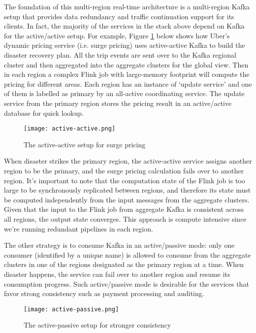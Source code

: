 \documentclass[sigconf]{acmart}
\begin{document}
The foundation of this multi-region real-time architecture is a multi-region Kafka setup that provides data redundancy and traffic continuation support for its clients. In fact, the majority of the services in the stack above depend on Kafka for the active/active setup. For example, Figure \ref{fig:active-active} below shows how Uber’s dynamic pricing service (i.e. surge pricing) uses active-active Kafka to build the disaster recovery plan. All the trip events are sent over to the Kafka regional cluster and then aggregated into the aggregate clusters for the global view. Then in each region a complex Flink job with large-memory footprint will compute the pricing for different areas. Each region has an instance of ‘update service’ and one of them is labelled as primary by an all-active coordinating service. The update service from the primary region stores the pricing result in an active/active database for quick lookup.

\begin{figure}[h]
  \centering
  \texttt{[image: active-active.png]}
  \caption{The active-active setup for surge pricing}
  \label{fig:active-active}
\end{figure}

When disaster strikes the primary region, the active-active service assigns another region to be the primary, and the surge pricing calculation fails over to another region. It’s important to note that the computation state of the Flink job is too large to be synchronously replicated between regions, and therefore its state must be computed independently from the input messages from the aggregate clusters. Given that the input to the Flink job from aggregate Kafka is consistent across all regions, the output state converges. This approach is compute intensive since we’re running redundant pipelines in each region.

The other strategy is to consume Kafka in an active/passive mode: only one consumer (identified by a unique name) is allowed to consume from the aggregate clusters in one of the regions designated as the primary region at a time. When disaster happens, the service can fail over to another region and resume its consumption progress. Such active/passive mode is desirable for the services that favor strong consistency such as payment processing and auditing. 

\begin{figure}[h]
  \centering
  \texttt{[image: active-passive.png]}
  \caption{The active-passive setup for stronger consistency}
  \label{fig:active-passive}
\end{figure}
\end{document}
